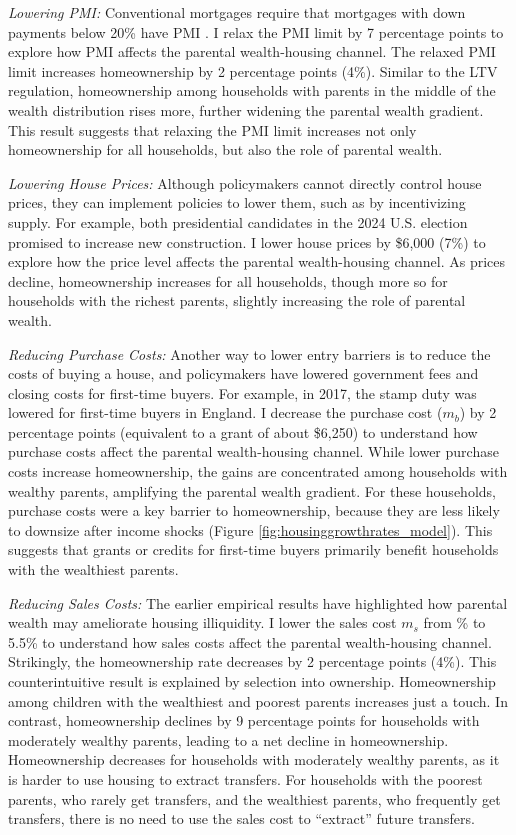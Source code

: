 \documentclass[12pt]{article}
\begin{document}
\textit{Lowering PMI:} Conventional mortgages require that mortgages with down payments below 20\% have PMI \cite{goodman2017sixty}. I relax the PMI limit by 7 percentage points to explore how PMI affects the parental wealth-housing channel. The relaxed PMI limit increases homeownership by 2 percentage points (4\%). Similar to the LTV regulation, homeownership among households with parents in the middle of the wealth distribution rises more, further widening the parental wealth gradient. This result suggests that relaxing the PMI limit increases not only homeownership for all households, but also the role of parental wealth.

\textit{Lowering House Prices:} Although policymakers cannot directly control house prices, they can implement policies to lower them, such as by incentivizing supply. For example, both presidential candidates in the 2024 U.S. election promised to increase new construction. I lower house prices by \$6,000 (7\%) to explore how the price level affects the parental wealth-housing channel. As prices decline, homeownership increases for all households, though more so for households with the richest parents, slightly increasing the role of parental wealth.

\textit{Reducing Purchase Costs:} Another way to lower entry barriers is to reduce the costs of buying a house, and policymakers have lowered government fees and closing costs for first-time buyers. For example, in 2017, the stamp duty was lowered for first-time buyers in England. I decrease the purchase cost ($m_b$) by 2 percentage points (equivalent to a grant of about \$6,250) to understand how purchase costs affect the parental wealth-housing channel. While lower purchase costs increase homeownership, the gains are concentrated among households with wealthy parents, amplifying the parental wealth gradient. For these households, purchase costs were a key barrier to homeownership, because they are less likely to downsize after income shocks (Figure \ref{fig:housinggrowthrates_model}). This suggests that grants or credits for first-time buyers primarily benefit households with the wealthiest parents.

\textit{Reducing Sales Costs:} The earlier empirical results have highlighted how parental wealth may ameliorate housing illiquidity. I lower the sales cost $m_s$ from \parms\% to 5.5\% to understand how sales costs affect the parental wealth-housing channel. Strikingly, the homeownership rate decreases by 2 percentage points (4\%). This counterintuitive result is explained by selection into ownership. Homeownership among children with the wealthiest and poorest parents increases just a touch. In contrast, homeownership declines by 9 percentage points for households with moderately wealthy parents, leading to a net decline in homeownership. Homeownership decreases for households with moderately wealthy parents, as it is harder to use housing to extract transfers. For households with the poorest parents, who rarely get transfers, and the wealthiest parents, who frequently get transfers, there is no need to use the sales cost to ``extract'' future transfers.
\end{document}
